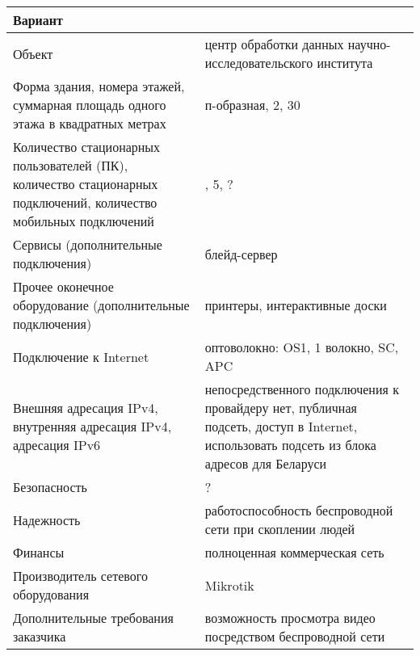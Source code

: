\begin{table}[htbp]
  \begin{tabular}{| >{\raggedright}p{}
                  | >{\raggedright\arraybackslash}p{}|}
    \hline
    Вариант &
    110
    \\ \hline

    Объект &
    центр обработки данных научно-исследовательского института
    \\ \hline

    Форма здания, номера этажей, суммарная площадь одного этажа в квадратных метрах &
    п-образная, 2, 30
    \\ \hline

    Количество стационарных пользователей (ПК), количество стационарных подключений, количество мобильных подключений &
    3, 5, ?
    \\ \hline

    Сервисы (дополнительные подключения) &
    блейд-сервер
    \\ \hline

    Прочее оконечное оборудование (дополнительные подключения) &
    принтеры, интерактивные доски
    \\ \hline

    Подключение к Internet &
    оптоволокно: OS1, 1 волокно, SC, APC
    \\ \hline

    Внешняя адресация IPv4, внутренняя адресация IPv4, адресация IPv6 &
    непосредственного подключения к провайдеру нет, публичная подсеть, доступ в Internet, использовать подсеть из блока адресов для Беларуси
    \\ \hline

    Безопасность &
    ?
    \\ \hline

    Надежность &
    работоспособность беспроводной сети при скоплении людей
    \\ \hline

    Финансы &
    полноценная коммерческая сеть
    \\ \hline

    Производитель сетевого оборудования &
    Mikrotik
    \\ \hline

    Дополнительные требования заказчика &
    возможность просмотра видео посредством беспроводной сети
    \\ \hline
  \end{tabular}
\end{table}

\newpage